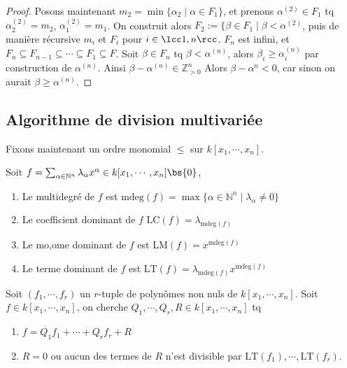 {\begin{proof}
                Posons maintenant $m_2 = \min \{\alpha_2 \mid \alpha \in F_1\}$, et prenons $\alpha^{(2)} \in F_1$ tq $\alpha_2^{(2)} = m_2$, $\alpha_1^{(2)} = m_1$. On construit alors $F_2 := \{\beta \in F_1 \mid \beta < \alpha^{(2)}$, puis de manière récursive $m_i$ et $F_i$ pour $i \in \lcc 1,n \rcc$. $F_n$ est infini, et $F_n \subseteq F_{n-1} \subseteq \cdots \subseteq F_1 \subseteq F$. Soit $\beta \in F_n$ tq $\beta < \alpha^{(n)}$, alors $\beta_i \geq \alpha_i^{(n)}$ par construction de $\alpha^{(n)}$. Ainsi $\beta - \alpha^{(n)} \in \mathbb{Z}^n_{> 0}$ Alors $\beta - \alpha^n < 0$, car sinon on aurait $\beta \geq \alpha^{(n)}$. 
            \end{proof}
            }

        \subsection{Algorithme de division multivariée}
            Fixons maintenant un ordre monomial $\leq$ sur $k[x_1, \cdots, x_n]$.
            \begin{defi}
                Soit $f = \sum_{\alpha \in \mathbb{N}^n} \lambda_\alpha x^\alpha \in k[x_1, \cdots, x_n] \bs \{0\}$, 
                \begin{enumerate}
                    \item Le multidegré de $f$ est $\mathrm{mdeg}(f) = \max \{\alpha \in \mathbb{N}^n \mid \lambda_\alpha \neq 0\}$
                    \item Le coefficient dominant de $f$ $\mathrm{LC}(f) = \lambda_{\mathrm{mdeg}(f)}$
                    \item Le mo,ome dominant de $f$ est $\mathrm{LM}(f) = x^{\mathrm{mdeg}(f)}$
                    \item Le terme dominant de $f$ est $\mathrm{LT}(f) = \lambda_{\mathrm{mdeg}(f)}x^{\mathrm{mdeg}(f)}$
                \end{enumerate}
            \end{defi}
            Soit $(f_1, \cdots, f_r)$ un $r$-tuple de polynômes non nuls de $k[x_1, \cdots, x_n]$. Soit $f \in k[x_1, \cdots, x_n]$, on cherche $Q_1, \cdots, Q_r, R \in k[x_1, \cdots, x_n]$ tq
            \begin{enumerate}
                \item $f = Q_1f_1 + \cdots + Q_r f_r + R$
                \item $R = 0$ ou aucun des termes de $R$ n'est divisible par $\mathrm{LT}(f_1), \cdots, \mathrm{LT}(f_r)$.
            \end{enumerate}


